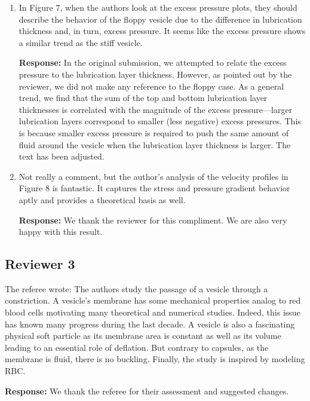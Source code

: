\documentclass[11pt]{article}
\begin{document}
\begin{enumerate}
\item In Figure 7, when the authors look at the excess pressure plots,
  they should describe the behavior of the floppy vesicle due to the
  difference in lubrication thickness and, in turn, excess pressure. It
  seems like the excess pressure shows a similar trend as the stiff
  vesicle.

\noindent
{\bf Response:} In the original submission, we attempted to relate the
excess pressure to the lubrication layer thickness. However, as pointed
out by the reviewer, we did not make any reference to the floppy case.
As a general trend, we find that the sum of the top and bottom
lubrication layer thicknesses is correlated with the magnitude of the
excess pressure---larger lubrication layers correspond to smaller (less
negative) excess pressures. This is because smaller excess pressure is
required to push the same amount of fluid around the vesicle when the
lubrication layer thickness is larger. The text has been adjusted.


\item Not really a comment, but the author's analysis of the velocity
  profiles in Figure 8 is fantastic. It captures the stress and pressure
  gradient behavior aptly and provides a theoretical basis as well.

\noindent
{\bf Response:} We thank the reviewer for this compliment. We are also
very happy with this result. 


\end{enumerate}

\newpage

\subsection*{Reviewer 3}

The referee wrote: The authors study the passage of a vesicle through a
constriction. A vesicle’s membrane has some mechanical properties analog
to red blood cells motivating many theoretical and numerical studies.
Indeed, this issue has known many progress during the last decade. A
vesicle is also a fascinating physical soft particle as its membrane
area is constant as well as its volume leading to an essential role of
deflation. But contrary to capsules, as the membrane is fluid, there is
no buckling. Finally, the study is inspired by modeling RBC. 

\noindent
{\bf Response:} We thank the referee for their assessment and suggested
changes.
\end{document}
